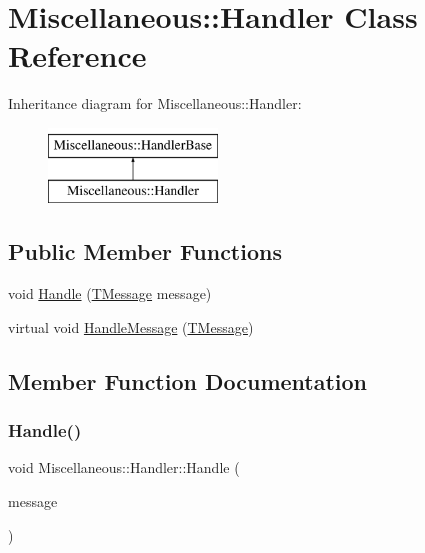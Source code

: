 \hypertarget{classMiscellaneous_1_1Handler}{}\section{Miscellaneous\+::Handler Class Reference}
\label{classMiscellaneous_1_1Handler}
Inheritance diagram for Miscellaneous\+::Handler\+:\begin{figure}[H]
\begin{center}
\leavevmode
\includegraphics[height=2.000000cm]{classMiscellaneous_1_1Handler}
\end{center}
\end{figure}
\subsection*{Public Member Functions}
\begin{DoxyCompactItemize}
\item 
void \mbox{\hyperlink{classMiscellaneous_1_1Handler_aff9e4c836a9d262a82bdfd5034c42309}{Handle}} (\mbox{\hyperlink{classMiscellaneous_1_1TMessage}{T\+Message}} message)
\item 
virtual void \mbox{\hyperlink{classMiscellaneous_1_1Handler_a33c5675aa05ac3c973e9a4457e3fea71}{Handle\+Message}} (\mbox{\hyperlink{classMiscellaneous_1_1TMessage}{T\+Message}})
\end{DoxyCompactItemize}


\subsection{Member Function Documentation}
\mbox{\label{classMiscellaneous_1_1Handler_aff9e4c836a9d262a82bdfd5034c42309}} 
\subsubsection{\texorpdfstring{Handle()}{Handle()}}
{\footnotesize\ttfamily void Miscellaneous\+::\+Handler\+::\+Handle (\begin{DoxyParamCaption}\item[{\mbox{\hyperlink{classMiscellaneous_1_1TMessage}{T\+Message}}}]{message }\end{DoxyParamCaption})\hspace{0.3cm}{\ttfamily [inline]}}

